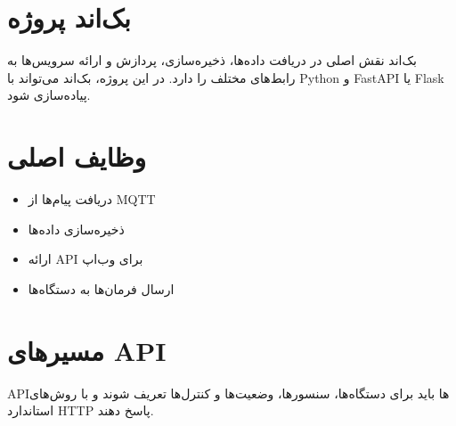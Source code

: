 \section{بک‌اند پروژه}

بک‌اند نقش اصلی در دریافت داده‌ها، ذخیره‌سازی، پردازش و ارائه سرویس‌ها به رابط‌های مختلف را دارد. در این پروژه، بک‌اند می‌تواند با Python و FastAPI یا Flask پیاده‌سازی شود.

\section{وظایف اصلی}

\begin{itemize}
    \item دریافت پیام‌ها از MQTT
    \item ذخیره‌سازی داده‌ها
    \item ارائه API برای وب‌اپ
    \item ارسال فرمان‌ها به دستگاه‌ها
\end{itemize}

\section{مسیرهای API}

API‌ها باید برای دستگاه‌ها، سنسورها، وضعیت‌ها و کنترل‌ها تعریف شوند و با روش‌های استاندارد HTTP پاسخ دهند.
